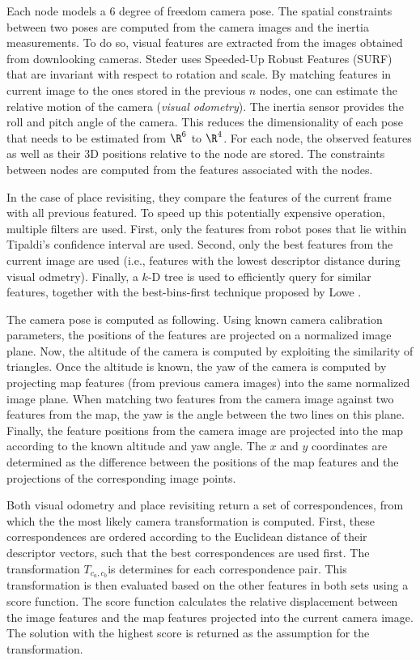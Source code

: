 Each node models a 6 degree of freedom camera pose.
The spatial constraints between two poses are computed from the camera images and the inertia measurements.
To do so, visual features are extracted from the images obtained from downlooking cameras.
Steder uses Speeded-Up Robust Features (SURF) \cite{Bay2008cviu} that are invariant with respect to rotation and scale.
By matching features in current image to the ones stored in the previous $n$ nodes, one can estimate the relative motion of the camera (\textit{visual odometry}).
The inertia sensor provides the roll and pitch angle of the camera.
This reduces the dimensionality of each pose that needs to be estimated from $\R^6$ to $\R^4$.
For each node, the observed features as well as their 3D positions relative to the node are stored.
The constraints between nodes are computed from the features associated with the nodes.

In the case of place revisiting, they compare the features of the current frame with all previous featured.
To speed up this potentially expensive operation, multiple filters are used.
First, only the features from robot poses that lie within Tipaldi's \cite{tipaldi2007approximate} confidence interval are used.
Second, only the best features from the current image are used (i.e., features with the lowest descriptor distance during visual odmetry).
Finally, a $k$-D tree is used to efficiently query for similar features, together with the best-bins-first technique proposed by Lowe \cite{lowe1999object}.

The camera pose is computed as following.
Using known camera calibration parameters, the positions of the features are projected on a normalized image plane.
Now, the altitude of the camera is computed by exploiting the similarity of triangles.
Once the altitude is known, the yaw of the camera is computed by projecting map features (from previous camera images) into the same normalized image plane.
When matching two features from the camera image against two features from the map, the yaw is the angle between the two  lines on this plane.
Finally, the feature positions from the camera image are projected into the map according to the known altitude and yaw angle.
The $x$ and $y$ coordinates are determined as the difference between the positions of the map features and the projections of the corresponding image points.

Both visual odometry and place revisiting return a set of correspondences, from which the the most likely camera transformation is computed.
First, these correspondences are ordered according to the Euclidean distance of their descriptor vectors, such that the best correspondences are used first.
The transformation $T_{c_a,c_b}$is determines for each correspondence pair.
This transformation is then evaluated based on the other features in both sets using a score function.
The score function calculates the relative displacement between the image features and the map features projected into the current camera image.
The solution with the highest score is returned as the assumption for the transformation.

